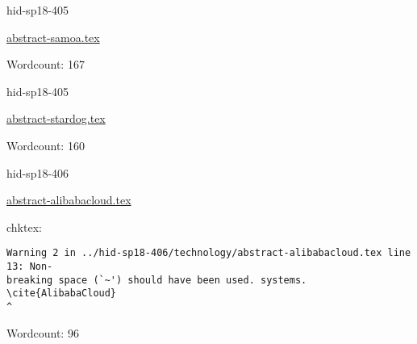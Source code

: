 

\begin{IU}

hid-sp18-405

\href{https://github.com/cloudmesh-community/hid-sp18-405/blob/master//technology/abstract-samoa.tex}{abstract-samoa.tex}

 

Wordcount: 167

\end{IU}



\begin{IU}

hid-sp18-405

\href{https://github.com/cloudmesh-community/hid-sp18-405/blob/master//technology/abstract-stardog.tex}{abstract-stardog.tex}

 

Wordcount: 160

\end{IU}



\begin{IU}

hid-sp18-406

\href{https://github.com/cloudmesh-community/hid-sp18-406/blob/master//technology/abstract-alibabacloud.tex}{abstract-alibabacloud.tex}

 
chktex:
\begin{tiny}
\begin{verbatim}
Warning 2 in ../hid-sp18-406/technology/abstract-alibabacloud.tex line 13: Non-
breaking space (`~') should have been used. systems. \cite{AlibabaCloud}
^
\end{verbatim}
\end{tiny}

Wordcount: 96

\end{IU}



